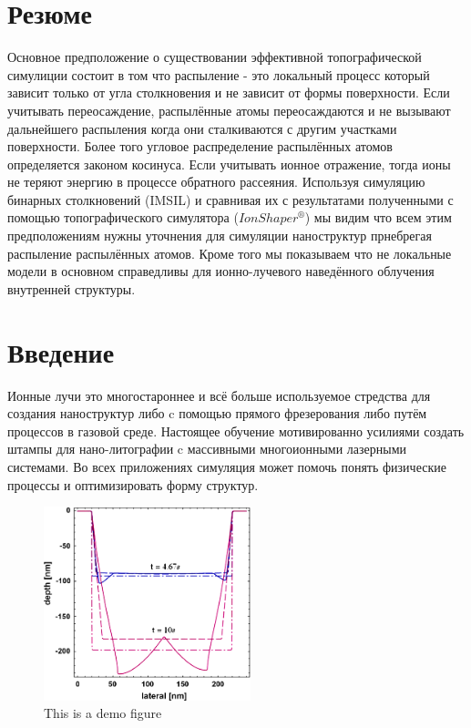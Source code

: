 \documentclass[a4paper,fontsize=12pt]{article}
\begin{document}
\section{Резюме}
Основное предположение о существовании эффективной топографической симулиции состоит в том что распыление - это локальный процесс который зависит только от угла столкновения и не зависит от формы поверхности. Если учитывать переосаждение, распылённые атомы переосаждаются и не вызывают дальнейшего распыления когда они сталкиваются с другим участками поверхности. Более того угловое распределение распылённых атомов определяется законом косинуса. Если учитывать ионное отражение, тогда ионы не теряют энергию в процессе обратного рассеяния. Используя симуляцию бинарных столкновений (IMSIL) и сравнивая их с результатами полученными с помощью топографического симулятора ($IonShaper^{®}$) мы видим что всем этим предположениям нужны уточнения для симуляции наноструктур прнебрегая распыление распылённых атомов. Кроме того мы показываем что не локальные модели в основном справедливы для ионно-лучевого наведённого облучения внутренней структуры.

\section{Введение}
Ионные лучи это многостароннее и всё больше используемое стредства для создания наноструктур либо c помощью прямого фрезерования либо путём процессов в газовой среде. Настоящее обучение мотивированно усилиями создать штампы для нано-литографии c массивными многоионными лазерными системами. Во всех приложениях симуляция может помочь понять физические процессы и оптимизировать форму структур.


\begin{figure}[h]
    \centering
    \includegraphics[width=6cm]{images/1.eps}
    \caption{This is a demo figure}
    \label{fig:demo1}
\end{figure}
\end{document}
